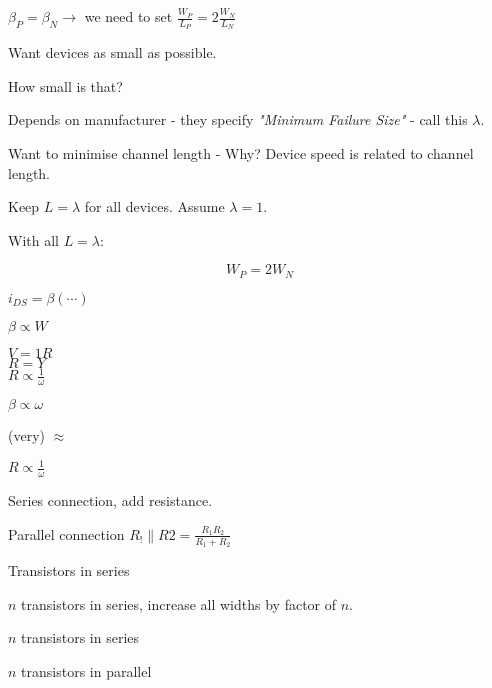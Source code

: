 \documentclass[a4paper,12pt]{article}
\begin{document}
$\beta_{P} = \beta_{N} \rightarrow$ we need to set $\frac{W_{P}}{L_{P}}
= 2 \frac{W_{N}}{L_{N}}$


Want devices as small as possible.

How small is that?

Depends on manufacturer - they specify \emph{"Minimum Failure Size"} -
call this $\lambda$.

Want to minimise channel length - Why? Device speed is related to
channel length.

Keep $L = \lambda$ for all devices. Assume $\lambda = 1$.

With all $L = \lambda$:

\[ W_{P} = 2 W_{N} \]


\begin{table}[hbtp]


\end{table}

$i_{DS} = \beta ( \cdots )$

$\beta \propto W$

$V = 1 R$ \\
$R = Y$ \\
$R \propto \frac{1}{\omega}$

\begin{table}[hbtp]

$\beta \propto \omega$


(very) $\approx$

$R \propto \frac{1}{\omega}$


\end{table}

Series connection, add resistance.

Parallel connection $R_{!} \parallel R{2} = \frac{R_{1} R_{2}}{R_{1} + R_{2}}$

Transistors in series

$n$ transistors in series, increase all widths by factor of $n$.

\begin{table}[hbtp]


\caption{$n$ transistors in series}

\end{table}


\begin{table}[hbtp]


\caption{$n$ transistors in parallel}

\end{table}
\end{document}
